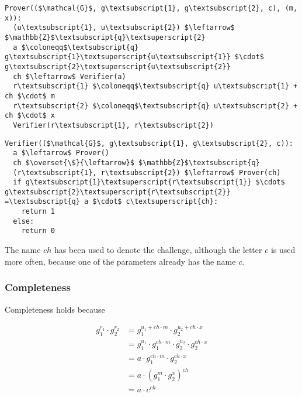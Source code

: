 \documentclass{article}
\begin{document}
\begin{Verbatim}[commandchars=\\\{\},codes={\catcode`$=3\catcode`_=8}]
Prover(($\mathcal{G}$, g\textsubscript{1}, g\textsubscript{2}, c), (m, x)):
  (u\textsubscript{1}, u\textsubscript{2}) $\leftarrow$ $\mathbb{Z}$\textsubscript{q}\textsuperscript{2}
  a $\coloneqq$\textsubscript{q} g\textsubscript{1}\textsuperscript{u\textsubscript{1}} $\cdot$ g\textsubscript{2}\textsuperscript{u\textsubscript{2}}
  ch $\leftarrow$ Verifier(a)
  r\textsubscript{1} $\coloneqq$\textsubscript{q} u\textsubscript{1} + ch $\cdot$ m
  r\textsubscript{2} $\coloneqq$\textsubscript{q} u\textsubscript{2} + ch $\cdot$ x
  Verifier(r\textsubscript{1}, r\textsubscript{2})
\end{Verbatim}

\begin{Verbatim}[commandchars=\\\{\},codes={\catcode`$=3\catcode`_=8}]
Verifier(($\mathcal{G}$, g\textsubscript{1}, g\textsubscript{2}, c)):
  a $\leftarrow$ Prover()
  ch $\overset{\$}{\leftarrow}$ $\mathbb{Z}$\textsubscript{q}
  (r\textsubscript{1}, r\textsubscript{2}) $\leftarrow$ Prover(ch)
  if g\textsubscript{1}\textsuperscript{r\textsubscript{1}} $\cdot$ g\textsubscript{2}\textsuperscript{r\textsubscript{2}} =\textsubscript{q} a $\cdot$ c\textsuperscript{ch}:
    return 1
  else:
    return 0
\end{Verbatim}

The name $ch$ has been used to denote the challenge, although the 
letter $c$ is used more often, because one of the parameters 
already has the name $c$.

\subsubsection{Completeness}

Completeness holds because

\begin{align*}
  g_1^{r_1} \cdot g_2^{r_2} 
    &= g_1^{u_1 + ch \cdot m} \cdot g_2^{u_2 + ch \cdot x} \\
    &= g_1^{u_1} \cdot g_1^{ch \cdot m} \cdot g_2^{u_2} \cdot g_2^{ch \cdot x} \\
    &= a \cdot g_1^{ch \cdot m} \cdot g_2^{ch \cdot x} \\
    &= a \cdot (g_1^{m} \cdot g_2^{x})^{ch} \\
    &= a \cdot c^{ch} \\
\end{align*}
\end{document}
